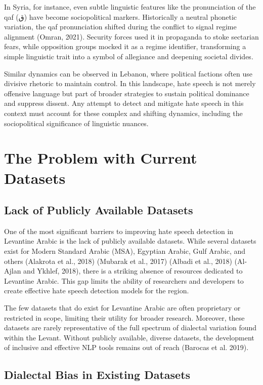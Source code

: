 \documentclass[11pt]{article}
\begin{document}
In Syria, for instance, even subtle linguistic features like the pronunciation of the qaf (ق) have become sociopolitical markers. Historically a neutral phonetic variation, the qaf pronunciation shifted during the conflict to signal regime alignment (Omran, 2021). Security forces used it in propaganda to stoke sectarian fears, while opposition groups mocked it as a regime identifier, transforming a simple linguistic trait into a symbol of allegiance and deepening societal divides.

Similar dynamics can be observed in Lebanon, where political factions often use divisive rhetoric to maintain control. In this landscape, hate speech is not merely offensive language but part of broader strategies to sustain political dominance and suppress dissent. Any attempt to detect and mitigate hate speech in this context must account for these complex and shifting dynamics, including the sociopolitical significance of linguistic nuances.


\section{The Problem with Current Datasets}

\subsection{Lack of Publicly Available Datasets}

One of the most significant barriers to improving hate speech detection in Levantine Arabic is the lack of publicly available datasets. While several datasets exist for Modern Standard Arabic (MSA), Egyptian Arabic, Gulf Arabic, and others (Alakrota et al., 2018) (Mubarak et al., 2017) (Albadi et al., 2018) (Al-Ajlan and Ykhlef, 2018), there is a striking absence of resources dedicated to Levantine Arabic. This gap limits the ability of researchers and developers to create effective hate speech detection models for the region.

The few datasets that do exist for Levantine Arabic are often proprietary or restricted in scope, limiting their utility for broader research. Moreover, these datasets are rarely representative of the full spectrum of dialectal variation found within the Levant. Without publicly available, diverse datasets, the development of inclusive and effective NLP tools remains out of reach (Barocas et al. 2019).

\subsection{Dialectal Bias in Existing Datasets}
\end{document}
